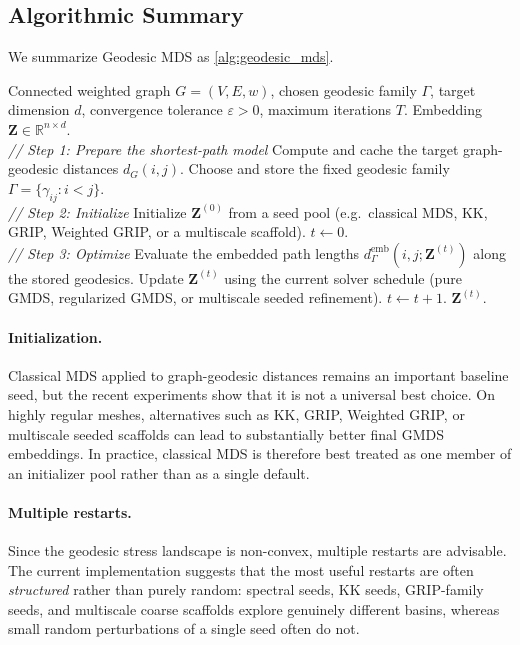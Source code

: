 \documentclass[11pt]{article}
\newcommand{\R}{\mathbb{R}}
\newcommand{\bZ}{\mathbf{Z}}
\newcommand{\abs}[1]{\left|#1\right|}
\newcommand{\demb}{d^{\mathrm{emb}}}
\theoremstyle{definition}
\theoremstyle{plain}
\theoremstyle{remark}
\begin{document}
\subsection{Algorithmic Summary}

We summarize Geodesic MDS as \cref{alg:geodesic_mds}.

\begin{algorithm}
\caption{Geodesic MDS}
\label{alg:geodesic_mds}
\begin{algorithmic}[1]
  \REQUIRE Connected weighted graph $G=(V,E,w)$, chosen geodesic family
           $\Gamma$, target dimension $d$, convergence tolerance
           $\varepsilon>0$, maximum iterations $T$.
  \ENSURE Embedding $\bZ \in \R^{n \times d}$.
  \\
  \textit{// Step 1: Prepare the shortest-path model}
  \STATE Compute and cache the target graph-geodesic distances $d_G(i,j)$.
  \STATE Choose and store the fixed geodesic family
         $\Gamma = \{\gamma_{ij}: i<j\}$.
  \\
  \textit{// Step 2: Initialize}
  \STATE Initialize $\bZ^{(0)}$ from a seed pool
         (e.g.\ classical MDS, KK, GRIP, Weighted GRIP, or a multiscale scaffold).
  \STATE $t \leftarrow 0$.
  \\
  \textit{// Step 3: Optimize}
  \REPEAT
    \STATE Evaluate the embedded path lengths
           $\demb_{\Gamma}(i,j;\bZ^{(t)})$ along the stored geodesics.
    \STATE Update $\bZ^{(t)}$ using the current solver schedule
           (pure GMDS, regularized GMDS, or multiscale seeded refinement).
    \STATE $t \leftarrow t + 1$.
  \UNTIL{$\abs{\sigma^{\mathrm{geo}}(\bZ^{(t)}) - \sigma^{\mathrm{geo}}(\bZ^{(t-1)})} < \varepsilon$
         or $t \geq T$.}
  \RETURN $\bZ^{(t)}$.
\end{algorithmic}
\end{algorithm}

\paragraph{Initialization.}
Classical MDS applied to graph-geodesic distances remains an important baseline
seed, but the recent experiments show that it is not a universal best choice.
On highly regular meshes, alternatives such as KK, GRIP, Weighted GRIP, or
multiscale seeded scaffolds can lead to substantially better final GMDS
embeddings.  In practice, classical MDS is therefore best treated as one member
of an initializer pool rather than as a single default.

\paragraph{Multiple restarts.}
Since the geodesic stress landscape is non-convex, multiple restarts are
advisable.  The current implementation suggests that the most useful restarts
are often \emph{structured} rather than purely random: spectral seeds, KK
seeds, GRIP-family seeds, and multiscale coarse scaffolds explore genuinely
different basins, whereas small random perturbations of a single seed often do
not.
\end{document}
